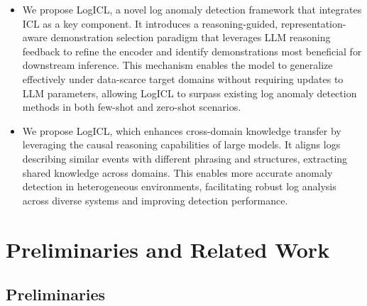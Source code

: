 \documentclass[lettersize,journal]{IEEEtran}
\begin{document}
\begin{itemize}

\item We propose LogICL, a novel log anomaly detection framework that integrates ICL as a key component. It introduces a reasoning-guided, representation-aware demonstration selection paradigm that leverages LLM reasoning feedback to refine the encoder and identify demonstrations most beneficial for downstream inference. This mechanism enables the model to generalize effectively under data-scarce target domains without requiring updates to LLM parameters, allowing LogICL to surpass existing log anomaly detection methods in both few-shot and zero-shot scenarios.

\item We propose LogICL, which enhances cross-domain knowledge transfer by leveraging the causal reasoning capabilities of large models. It aligns logs describing similar events with different phrasing and structures, extracting shared knowledge across domains. This enables more accurate anomaly detection in heterogeneous environments, facilitating robust log analysis across diverse systems and improving detection performance.
\end{itemize}

\section{Preliminaries and Related Work}
\subsection{Preliminaries}

    
\end{document}
